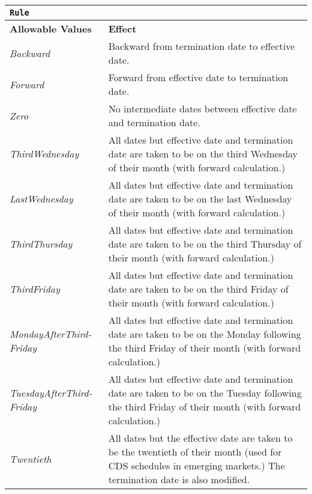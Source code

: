 \begin{longtable}{| p{} | p{} |}
\hline
\multicolumn{2}{|l|}{\lstinline!Rule!}                    \\ \hline
\textbf{Allowable Values}                   & \textbf{Effect}                       \\ \hline
\emph{Backward}   &   Backward from termination date to effective date.   \\ \hline
\emph{Forward}   &   Forward from effective date to termination date.  \\ \hline
\emph{Zero}   &   No intermediate dates between effective date and termination date.  \\ \hline
\emph{ThirdWednesday}   &   All dates but effective date and
                          termination date are taken to be on the
                          third Wednesday of their month (with forward calculation.) \\ \hline
\emph{LastWednesday}   &   All dates but effective date and
                          termination date are taken to be on the
                          last Wednesday of their month (with forward calculation.) \\ \hline
\emph{ThirdThursday}   &   All dates but effective date and
                          termination date are taken to be on the
                          third Thursday of their month (with forward calculation.) \\ \hline
\emph{ThirdFriday}   &   All dates but effective date and
                          termination date are taken to be on the
                          third Friday of their month (with forward calculation.) \\ \hline
\emph{MondayAfterThird-} 
\emph{Friday}  &   All dates but effective date and
                          termination date are taken to be on the
                          Monday following the third Friday of their month (with forward calculation.) \\ \hline
\emph{TuesdayAfterThird-}
\emph{Friday}   &   All dates but effective date and
                          termination date are taken to be on the
                          Tuesday following the third Friday of their month (with forward calculation.) \\ \hline
\emph{Twentieth}   &   All dates but the effective date are taken to be the twentieth of their month (used for CDS schedules in emerging markets.)  The termination date is also modified. \\ \hline

\end{longtable}
